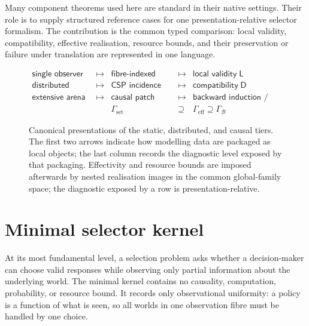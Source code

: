 \documentclass[11pt]{article}
\theoremstyle{plain}
\theoremstyle{definition}
\theoremstyle{remark}
\begin{document}
Many component theorems used here are standard in their native settings. Their
role is to supply structured reference cases for one presentation-relative
selector formalism. The contribution is the common typed comparison: local
validity, compatibility, effective realisation, resource bounds, and their
preservation or failure under translation are represented in one language.

\begin{figure}[htbp]
\centering
\[
\begin{array}{rclcl}
\textsf{single observer}
&\longmapsto&
\textsf{fibre-indexed selector}
&\longmapsto&
\textsf{local validity}\;\mathsf L
\\[1mm]
\textsf{distributed observers}
&\longmapsto&
\textsf{CSP incidence diagram}
&\longmapsto&
\textsf{compatibility}\;\mathsf D
\\[1mm]
\textsf{extensive arena}
&\longmapsto&
\textsf{causal patch sheaf}
&\longmapsto&
\textsf{backward induction / matching}
\\[2mm]
&&
\Gamma_{\mathrm{set}}
&\supseteq&
\Gamma_{\mathrm{eff}}\supseteq\Gamma_{\mathcal B}
\end{array}
\]
\caption{Canonical presentations of the static, distributed, and causal tiers.
The first two arrows indicate how modelling data are packaged as local objects;
the last column records the diagnostic level exposed by that packaging.
Effectivity and resource bounds are imposed afterwards by nested realisation
images in the common global-family space; the diagnostic exposed by a row is
presentation-relative.}
\label{fig:architecture}
\end{figure}

\section{Minimal selector kernel}\label{sec:kernel}

At its most fundamental level, a selection problem asks whether a
decision-maker can choose valid responses while observing only partial
information about the underlying world. The minimal kernel contains no causality,
computation, probability, or resource bound. It records only observational
uniformity: a policy is a function of what is seen, so all worlds in one
observation fibre must be handled by one choice.
\end{document}
